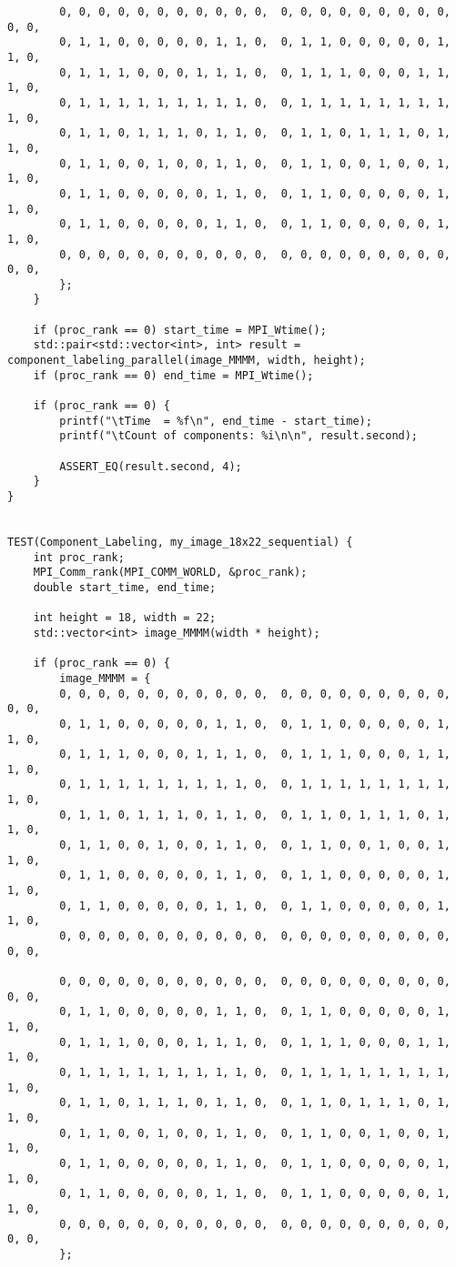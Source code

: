 \documentclass{report}
\begin{document}
\begin{lstlisting}
        0, 0, 0, 0, 0, 0, 0, 0, 0, 0, 0,  0, 0, 0, 0, 0, 0, 0, 0, 0, 0, 0,
        0, 1, 1, 0, 0, 0, 0, 0, 1, 1, 0,  0, 1, 1, 0, 0, 0, 0, 0, 1, 1, 0,
        0, 1, 1, 1, 0, 0, 0, 1, 1, 1, 0,  0, 1, 1, 1, 0, 0, 0, 1, 1, 1, 0,
        0, 1, 1, 1, 1, 1, 1, 1, 1, 1, 0,  0, 1, 1, 1, 1, 1, 1, 1, 1, 1, 0,
        0, 1, 1, 0, 1, 1, 1, 0, 1, 1, 0,  0, 1, 1, 0, 1, 1, 1, 0, 1, 1, 0,
        0, 1, 1, 0, 0, 1, 0, 0, 1, 1, 0,  0, 1, 1, 0, 0, 1, 0, 0, 1, 1, 0,
        0, 1, 1, 0, 0, 0, 0, 0, 1, 1, 0,  0, 1, 1, 0, 0, 0, 0, 0, 1, 1, 0,
        0, 1, 1, 0, 0, 0, 0, 0, 1, 1, 0,  0, 1, 1, 0, 0, 0, 0, 0, 1, 1, 0,
        0, 0, 0, 0, 0, 0, 0, 0, 0, 0, 0,  0, 0, 0, 0, 0, 0, 0, 0, 0, 0, 0,
        };
    }

    if (proc_rank == 0) start_time = MPI_Wtime();
    std::pair<std::vector<int>, int> result = component_labeling_parallel(image_MMMM, width, height);
    if (proc_rank == 0) end_time = MPI_Wtime();

    if (proc_rank == 0) {
        printf("\tTime  = %f\n", end_time - start_time);
        printf("\tCount of components: %i\n\n", result.second);

        ASSERT_EQ(result.second, 4);
    }
}


TEST(Component_Labeling, my_image_18x22_sequential) {
    int proc_rank;
    MPI_Comm_rank(MPI_COMM_WORLD, &proc_rank);
    double start_time, end_time;

    int height = 18, width = 22;
    std::vector<int> image_MMMM(width * height);

    if (proc_rank == 0) {
        image_MMMM = {
        0, 0, 0, 0, 0, 0, 0, 0, 0, 0, 0,  0, 0, 0, 0, 0, 0, 0, 0, 0, 0, 0,
        0, 1, 1, 0, 0, 0, 0, 0, 1, 1, 0,  0, 1, 1, 0, 0, 0, 0, 0, 1, 1, 0,
        0, 1, 1, 1, 0, 0, 0, 1, 1, 1, 0,  0, 1, 1, 1, 0, 0, 0, 1, 1, 1, 0,
        0, 1, 1, 1, 1, 1, 1, 1, 1, 1, 0,  0, 1, 1, 1, 1, 1, 1, 1, 1, 1, 0,
        0, 1, 1, 0, 1, 1, 1, 0, 1, 1, 0,  0, 1, 1, 0, 1, 1, 1, 0, 1, 1, 0,
        0, 1, 1, 0, 0, 1, 0, 0, 1, 1, 0,  0, 1, 1, 0, 0, 1, 0, 0, 1, 1, 0,
        0, 1, 1, 0, 0, 0, 0, 0, 1, 1, 0,  0, 1, 1, 0, 0, 0, 0, 0, 1, 1, 0,
        0, 1, 1, 0, 0, 0, 0, 0, 1, 1, 0,  0, 1, 1, 0, 0, 0, 0, 0, 1, 1, 0,
        0, 0, 0, 0, 0, 0, 0, 0, 0, 0, 0,  0, 0, 0, 0, 0, 0, 0, 0, 0, 0, 0,

        0, 0, 0, 0, 0, 0, 0, 0, 0, 0, 0,  0, 0, 0, 0, 0, 0, 0, 0, 0, 0, 0,
        0, 1, 1, 0, 0, 0, 0, 0, 1, 1, 0,  0, 1, 1, 0, 0, 0, 0, 0, 1, 1, 0,
        0, 1, 1, 1, 0, 0, 0, 1, 1, 1, 0,  0, 1, 1, 1, 0, 0, 0, 1, 1, 1, 0,
        0, 1, 1, 1, 1, 1, 1, 1, 1, 1, 0,  0, 1, 1, 1, 1, 1, 1, 1, 1, 1, 0,
        0, 1, 1, 0, 1, 1, 1, 0, 1, 1, 0,  0, 1, 1, 0, 1, 1, 1, 0, 1, 1, 0,
        0, 1, 1, 0, 0, 1, 0, 0, 1, 1, 0,  0, 1, 1, 0, 0, 1, 0, 0, 1, 1, 0,
        0, 1, 1, 0, 0, 0, 0, 0, 1, 1, 0,  0, 1, 1, 0, 0, 0, 0, 0, 1, 1, 0,
        0, 1, 1, 0, 0, 0, 0, 0, 1, 1, 0,  0, 1, 1, 0, 0, 0, 0, 0, 1, 1, 0,
        0, 0, 0, 0, 0, 0, 0, 0, 0, 0, 0,  0, 0, 0, 0, 0, 0, 0, 0, 0, 0, 0,
        };


\end{lstlisting}
\end{document}
